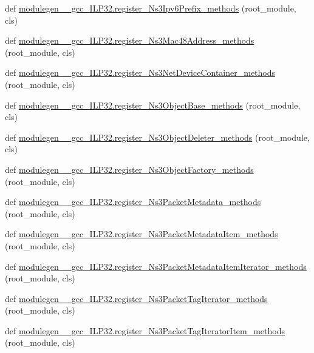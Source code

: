 \begin{DoxyCompactItemize}
def \hyperlink{namespacemodulegen____gcc__ILP32_aa8595c3a98eeb16457cb2bea21656ecd}{modulegen\+\_\+\+\_\+gcc\+\_\+\+I\+L\+P32.\+register\+\_\+\+Ns3\+Ipv6\+Prefix\+\_\+methods} (root\+\_\+module, cls)
\item 
def \hyperlink{namespacemodulegen____gcc__ILP32_a8e21fcb75de80cc6b1cd32abe7cfdd36}{modulegen\+\_\+\+\_\+gcc\+\_\+\+I\+L\+P32.\+register\+\_\+\+Ns3\+Mac48\+Address\+\_\+methods} (root\+\_\+module, cls)
\item 
def \hyperlink{namespacemodulegen____gcc__ILP32_aa9b79a6cfb60163ed439b9298fb5c7d7}{modulegen\+\_\+\+\_\+gcc\+\_\+\+I\+L\+P32.\+register\+\_\+\+Ns3\+Net\+Device\+Container\+\_\+methods} (root\+\_\+module, cls)
\item 
def \hyperlink{namespacemodulegen____gcc__ILP32_ae2b1090e9e01cb32c1979aebbbf2d3d0}{modulegen\+\_\+\+\_\+gcc\+\_\+\+I\+L\+P32.\+register\+\_\+\+Ns3\+Object\+Base\+\_\+methods} (root\+\_\+module, cls)
\item 
def \hyperlink{namespacemodulegen____gcc__ILP32_ae7b70d95135f82e9f3f5abb42654e3de}{modulegen\+\_\+\+\_\+gcc\+\_\+\+I\+L\+P32.\+register\+\_\+\+Ns3\+Object\+Deleter\+\_\+methods} (root\+\_\+module, cls)
\item 
def \hyperlink{namespacemodulegen____gcc__ILP32_a3c95ec67fc1514c6b5c58314ef81e38e}{modulegen\+\_\+\+\_\+gcc\+\_\+\+I\+L\+P32.\+register\+\_\+\+Ns3\+Object\+Factory\+\_\+methods} (root\+\_\+module, cls)
\item 
def \hyperlink{namespacemodulegen____gcc__ILP32_a219b8e3d7145a4b09888203032e16df7}{modulegen\+\_\+\+\_\+gcc\+\_\+\+I\+L\+P32.\+register\+\_\+\+Ns3\+Packet\+Metadata\+\_\+methods} (root\+\_\+module, cls)
\item 
def \hyperlink{namespacemodulegen____gcc__ILP32_aa4a4a003c4a8b7886a31cb3d1b2f9062}{modulegen\+\_\+\+\_\+gcc\+\_\+\+I\+L\+P32.\+register\+\_\+\+Ns3\+Packet\+Metadata\+Item\+\_\+methods} (root\+\_\+module, cls)
\item 
def \hyperlink{namespacemodulegen____gcc__ILP32_af0c41f86c2c7e2875da9fd12e03ec3df}{modulegen\+\_\+\+\_\+gcc\+\_\+\+I\+L\+P32.\+register\+\_\+\+Ns3\+Packet\+Metadata\+Item\+Iterator\+\_\+methods} (root\+\_\+module, cls)
\item 
def \hyperlink{namespacemodulegen____gcc__ILP32_a9af269241fe2e52d9713c6fef73ade54}{modulegen\+\_\+\+\_\+gcc\+\_\+\+I\+L\+P32.\+register\+\_\+\+Ns3\+Packet\+Tag\+Iterator\+\_\+methods} (root\+\_\+module, cls)
\item 
def \hyperlink{namespacemodulegen____gcc__ILP32_a81cdb0716a2447fa9ebf30a8a43132d5}{modulegen\+\_\+\+\_\+gcc\+\_\+\+I\+L\+P32.\+register\+\_\+\+Ns3\+Packet\+Tag\+Iterator\+Item\+\_\+methods} (root\+\_\+module, cls)

\end{DoxyCompactItemize}

